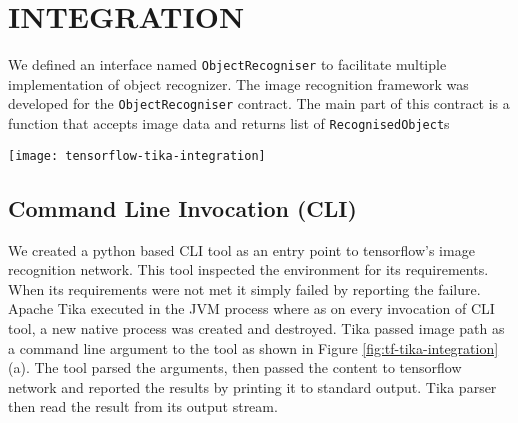 \section{INTEGRATION} \label{sec:integration}
We defined an interface named \texttt{ObjectRecogniser} to facilitate multiple implementation of object recognizer. The image recognition framework was developed for the \texttt{ObjectRecogniser} contract. The main part of this contract is a function that accepts image data and returns list of \texttt{RecognisedObject}s


\iffalse %
The following methods of integration were investigated in the order of listing:
\begin{itemize}
\item Command Line Invocation
\item Java Native Interface
\item gRPC Remote Procedure Calls
\item Representational State Transfer API
\end{itemize}
\fi %

\begin{figure*}
	\texttt{[image: tensorflow-tika-integration]}
	\caption{Tika and Tensorflow Integration}
	\label{fig:tf-tika-integration}
\end{figure*}

\subsection{Command Line Invocation (CLI)} \label{sec:int-cli}
We created a python based CLI tool as an entry point to tensorflow's image recognition network. This tool inspected the environment for its requirements. When its requirements were not met it simply failed by reporting the failure. Apache Tika executed in the JVM process where as on every invocation of CLI tool, a new native process was created and destroyed. Tika passed image path as a command line argument to the tool as shown in Figure \ref{fig:tf-tika-integration} (a). The tool parsed the arguments, then passed the content to tensorflow network and reported the results by printing it to standard output. Tika parser then read the result from its output stream.

